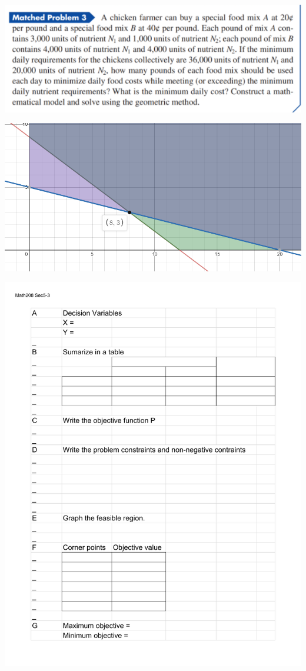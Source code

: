 \documentclass[14pt]{extarticle}
\begin{document}
\includegraphics[width=0.9\linewidth]{5-3_03}
\begin{center}
	\includegraphics[width=0.9\linewidth]{5-3-p2}
\end{center}

\begin{center}
	\includegraphics[width=1.0\linewidth]{Math208 Sec5-3 prob2}
\end{center}
\end{document}
